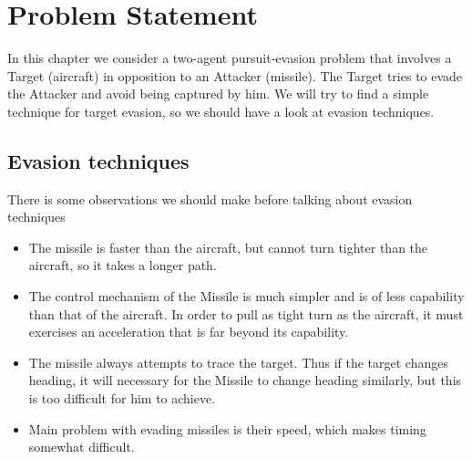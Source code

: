 \section{Problem Statement}
In this chapter we consider a two-agent pursuit-evasion problem that involves  a Target (aircraft) in opposition to an Attacker (missile). The Target tries to evade the Attacker and avoid being captured by him. We will try to find a simple technique for target evasion, so we should have a look at evasion techniques.

\subsection{Evasion techniques}
There is some observations we should make before talking about evasion techniques 
\begin{itemize}
	\item The missile is faster than the aircraft, but cannot turn tighter than the aircraft, so it takes a longer path.
	\item The control mechanism of the Missile is much simpler and is of less capability than that of the aircraft. In order to pull as tight turn as the aircraft, it must exercises an acceleration that is far beyond its capability.
	\item The missile always attempts to trace the target. Thus if the target changes heading, it will necessary for the Missile to change heading similarly, but this is too difficult for him to achieve.
	\item  Main problem with evading missiles is their speed, which makes timing somewhat difficult.
\end{itemize}

